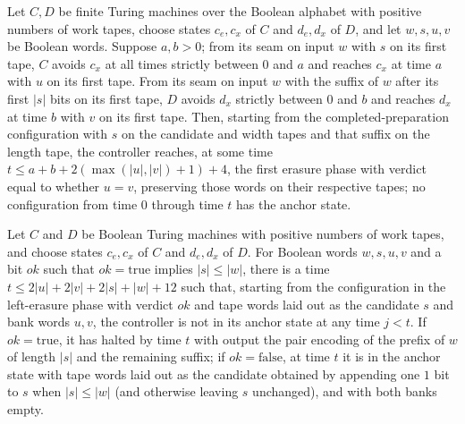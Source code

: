\begin{lemma}
\label{Turing.FinTM.emitterP2_body_test}
\leanok
{}
Let $C,D$ be finite Turing machines over the Boolean alphabet with positive numbers of
work tapes, choose states $c_e,c_x$ of $C$ and $d_e,d_x$ of $D$, and let $w,s,u,v$ be
Boolean words. Suppose $a,b>0$; from its seam on input $w$ with $s$ on its first tape,
$C$ avoids $c_x$ at all times strictly between $0$ and $a$ and reaches $c_x$ at time $a$
with $u$ on its first tape. From its seam on input $w$ with the suffix of $w$ after its
first $|s|$ bits on its first tape, $D$ avoids $d_x$ strictly between $0$ and $b$ and
reaches $d_x$ at time $b$ with $v$ on its first tape. Then, starting from the
completed-preparation configuration with $s$ on the candidate and width tapes and that
suffix on the length tape, the controller reaches, at some time $t\le
a+b+2(\max(|u|,|v|)+1)+4$, the first erasure phase with verdict equal to whether $u=v$,
preserving those words on their respective tapes; no configuration from time $0$ through
time $t$ has the anchor state.
\end{lemma}

\begin{lemma}
\label{Turing.FinTM.emitterP2_body_finish}
\leanok
{}
Let $C$ and $D$ be Boolean Turing machines with positive numbers of work tapes, and
choose states $c_e,c_x$ of $C$ and $d_e,d_x$ of $D$. For Boolean words $w,s,u,v$ and a
bit $ok$ such that $ok=\mathrm{true}$ implies $|s|\le |w|$, there is a time $t\le
2|u|+2|v|+2|s|+|w|+12$ such that, starting from the configuration in the left-erasure
phase with verdict $ok$ and tape words laid out as the candidate $s$ and bank words
$u,v$, the controller is not in its anchor state at any time $j<t$. If
$ok=\mathrm{true}$, it has halted by time $t$ with output the pair encoding of the
prefix of $w$ of length $|s|$ and the remaining suffix; if $ok=\mathrm{false}$, at time
$t$ it is in the anchor state with tape words laid out as the candidate obtained by
appending one $1$ bit to $s$ when $|s|\le |w|$ (and otherwise leaving $s$ unchanged),
and with both banks empty.
\end{lemma}

